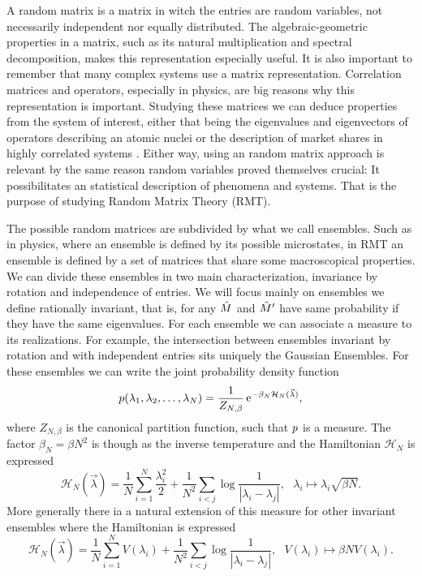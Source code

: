 A random matrix is a matrix in witch the entries are random variables, not necessarily independent nor equally distributed. The algebraic-geometric properties in a matrix, such as its natural multiplication and spectral decomposition, makes this representation especially useful. It is also important to remember that many complex systems use a matrix representation. Correlation matrices and operators, especially in physics, are big reasons why this representation is important. Studying these matrices we can deduce properties from the system of interest, either that being the eigenvalues and eigenvectors of operators describing an atomic nuclei \cite{Dyson} or the description of market shares in highly correlated systems \cite[Chapter~2]{fabozziquantitative}. Either way, using an random matrix approach is relevant by the same reason random variables proved themselves crucial: It possibilitates an statistical description of phenomena and systems. That is the purpose of studying Random Matrix Theory (RMT).

The possible random matrices are subdivided by what we call ensembles. Such as in physics, where an ensemble is defined by its possible microstates, in RMT an ensemble is defined by a set of matrices that share some macroscopical properties. We can divide these ensembles in two main characterization, invariance by rotation and independence of entries. We will focus mainly on ensembles we define rationally invariant, that is, for any $\hat M$ and $\hat M'$ have same probability if they have the same eigenvalues. For each ensemble we can associate a measure to its realizations. For example, the intersection between ensembles invariant by rotation and with independent entries sits uniquely the Gaussian Ensembles. For these ensembles we can write the joint probability density function
\begin{equation}
		p(\lambda_1, \lambda_2, \dots, \lambda_N) = \frac{1}{Z_{N, \beta}} \operatorname{e}^{-\beta_N \mathcal{H}_N(\vec{\lambda})},
	\label{Equation: Gaussian measure}
\end{equation}
where $Z_{N, \beta}$ is the canonical partition function, such that $p$ is a measure. The factor $\beta_N = \beta N^2$ is though as the inverse temperature and the Hamiltonian $\mathcal{H}_N$ is expressed $$\mathcal{H}_N(\vec{\lambda}) = \frac{1}{N}\sum_{i = 1}^{N} \frac{\lambda_i^2}{2} + \frac{1}{N^2} \sum_{i < j} \log{\frac{1}{|\lambda_i - \lambda_j|}}, \ \ \  \lambda_i \mapsto \lambda_i \sqrt{\beta N}.$$ More generally there ia a natural extension of this measure for other invariant ensembles where the Hamiltonian is expressed $$\mathcal{H}_N(\vec{\lambda}) = \frac{1}{N}\sum_{i = 1}^{N} V(\lambda_i) + \frac{1}{N^2} \sum_{i < j} \log{\frac{1}{|\lambda_i - \lambda_j|}}, \ \ \  V(\lambda_i) \mapsto \beta NV(\lambda_i).$$

